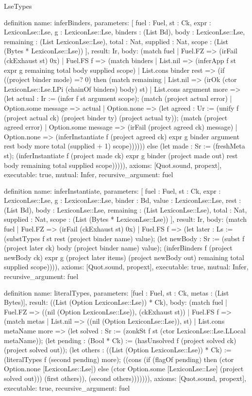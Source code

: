 \begin{lexlean}{LseTypes}
\begin{semanticmodule}
definition{
  name: inferBinders,
  parameters: [
    fuel : Fuel,
    st : Ck,
    expr : LexiconLse::Lse,
    g : LexiconLse::Lse,
    binders : (List Bd),
    body : LexiconLse::Lse,
    remaining : (List LexiconLse::Lse),
    total : Nat,
    supplied : Nat,
    scope : (List (Bytes * LexiconLse::Lse))
  ],
  result: Ir,
  body: (match fuel
    | Fuel.FZ => (irFail (ckExhaust st) 0x)
    | Fuel.FS f => (match binders
      | List.nil => (inferApp f st expr g remaining total body supplied scope)
      | List.cons binder rest => (if ((project binder mode) =? 0) then (match remaining
        | List.nil => (irOk (ctor LexiconLse::Lse.LPi (chainOf binders) body) st)
        | List.cons argument more => (let actual : Ir := (infer f st argument scope); (match (project actual error)
          | Option.some message => actual
          | Option.none => (let agreed : Ur := (unify f (project actual ck) (project binder ty) (project actual ty)); (match (project agreed error)
            | Option.some message => (irFail (project agreed ck) message)
            | Option.none => (inferInstantiate f (project agreed ck) expr g binder argument rest body more total (supplied + 1) scope)))))) else (let made : Sr := (freshMeta st); (inferInstantiate f (project made ck) expr g binder (project made out) rest body remaining total supplied scope))))),
  axioms: [Quot.sound, propext],
  executable: true,
  mutual: Infer,
  recursive_argument: fuel
}

definition{
  name: inferInstantiate,
  parameters: [
    fuel : Fuel,
    st : Ck,
    expr : LexiconLse::Lse,
    g : LexiconLse::Lse,
    binder : Bd,
    value : LexiconLse::Lse,
    rest : (List Bd),
    body : LexiconLse::Lse,
    remaining : (List LexiconLse::Lse),
    total : Nat,
    supplied : Nat,
    scope : (List (Bytes * LexiconLse::Lse))
  ],
  result: Ir,
  body: (match fuel
    | Fuel.FZ => (irFail (ckExhaust st) 0x)
    | Fuel.FS f => (let later : Ls := (substTypes f st rest (project binder name) value); (let newBody : Sr := (subst f (project later ck) body (project binder name) value); (inferBinders f (project newBody ck) expr g (project later items) (project newBody out) remaining total supplied scope)))),
  axioms: [Quot.sound, propext],
  executable: true,
  mutual: Infer,
  recursive_argument: fuel
}

definition{
  name: literalTypes,
  parameters: [fuel : Fuel, st : Ck, metas : (List Bytes)],
  result: ((List (Option LexiconLse::Lse)) * Ck),
  body: (match fuel
    | Fuel.FZ => ((nil (Option LexiconLse::Lse)), (ckExhaust st))
    | Fuel.FS f => (match metas
      | List.nil => ((nil (Option LexiconLse::Lse)), st)
      | List.cons metaName more => (let solved : Sr := (zonkSt f st (ctor LexiconLse::Lse.LLocal metaName)); (let pending : (Bool * Ck) := (hasUnsolved f (project solved ck) (project solved out)); (let others : ((List (Option LexiconLse::Lse)) * Ck) := (literalTypes f (second pending) more); ((cons (if (flagOf pending) then (ctor Option.none [LexiconLse::Lse]) else (ctor Option.some [LexiconLse::Lse] (project solved out))) (first others)), (second others))))))),
  axioms: [Quot.sound, propext],
  executable: true,
  recursive_argument: fuel
}


\end{semanticmodule}
\end{lexlean}
